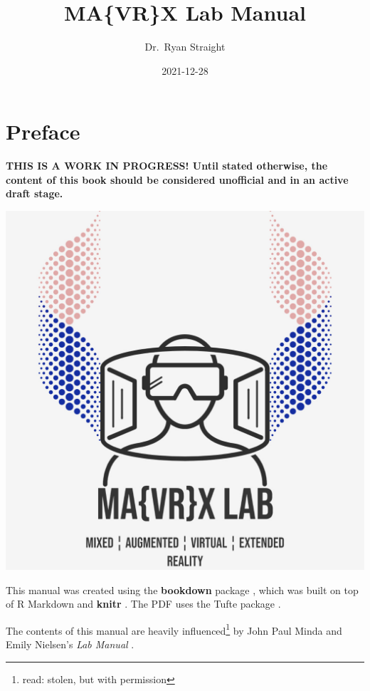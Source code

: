 \documentclass[]{tufte-book}
\title{MA\{VR\}X Lab Manual}
\author{Dr.~Ryan Straight}
\date{2021-12-28}
\begin{document}
\maketitle



{
\hypersetup{linkcolor=black}
\setcounter{tocdepth}{1}
\tableofcontents
}
\listoftables
\listoffigures

\hypertarget{preface}{%
\chapter*{Preface}\label{preface}}

\textbf{THIS IS A WORK IN PROGRESS! Until stated otherwise, the content of this book should be considered unofficial and in an active draft stage.}

\begin{center}\href{https://mavrxlab.org}{\includegraphics{images/square-solid} }\end{center}

This manual was created using the \textbf{bookdown} package \citep{R-bookdown}, which was built on top of R Markdown and \textbf{knitr} \citep{xie2015}. The PDF uses the Tufte package \citep{xieTufteTufteStyles2021}.

The contents of this manual are heavily influenced\footnote{read: stolen, but with permission} by John Paul Minda and Emily Nielsen's \emph{Lab Manual} \citeyearpar{Minda_Nielsen_2018}.
\end{document}
